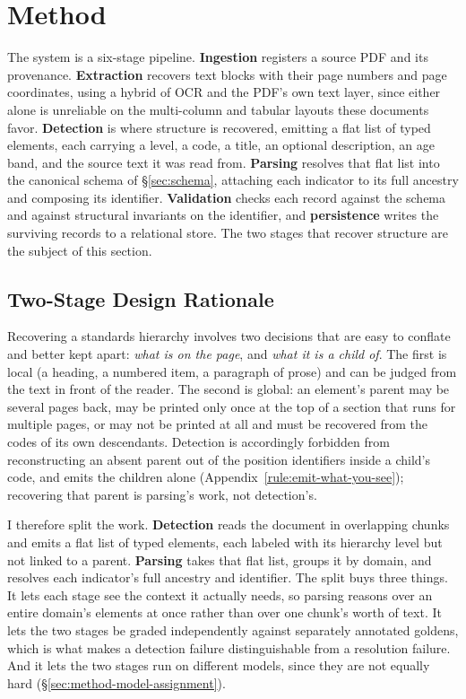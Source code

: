 \section{Method}
\label{sec:method}

The system is a six-stage pipeline. \textbf{Ingestion} registers a source PDF
and its provenance. \textbf{Extraction} recovers text blocks with their page
numbers and page coordinates, using a hybrid of OCR and the PDF's own text
layer, since either alone is unreliable on the multi-column and tabular layouts
these documents favor. \textbf{Detection} is where structure is recovered,
emitting a flat list of typed elements, each carrying a level, a code, a title,
an optional description, an age band, and the source text it was read from.
\textbf{Parsing} resolves that flat list into the canonical schema of
\S\ref{sec:schema}, attaching each indicator to its full ancestry and composing
its identifier. \textbf{Validation} checks each record against the schema and
against structural invariants on the identifier, and \textbf{persistence}
writes the surviving records to a relational store. The two stages that recover
structure are the subject of this section.

\subsection{Two-Stage Design Rationale}
\label{sec:method-two-stage}

Recovering a standards hierarchy involves two decisions that are easy to
conflate and better kept apart: \emph{what is on the page}, and \emph{what it
is a child of}. The first is local (a heading, a numbered item, a paragraph of
prose) and can be judged from the text in front of the reader. The second is
global: an element's parent may be several pages back, may be printed only once
at the top of a section that runs for multiple pages, or may not be printed at
all and must be recovered from the codes of its own descendants. Detection is
accordingly forbidden from reconstructing an absent parent out of the position
identifiers inside a child's code, and emits the children alone
(Appendix~\ref{rule:emit-what-you-see}); recovering that parent is parsing's
work, not detection's.

I therefore split the work. \textbf{Detection} reads the document in
overlapping chunks and emits a flat list of typed elements, each labeled with
its hierarchy level but not linked to a parent. \textbf{Parsing} takes that flat
list, groups it by domain, and resolves each indicator's full ancestry and
identifier. The split buys three things. It lets each stage see the context it
actually needs, so parsing reasons over an entire domain's elements at once
rather than over one chunk's worth of text. It lets the two stages be graded
independently against separately annotated goldens, which is what makes a
detection failure distinguishable from a resolution failure. And it lets the two
stages run on different models, since they are not equally hard
(\S\ref{sec:method-model-assignment}).

